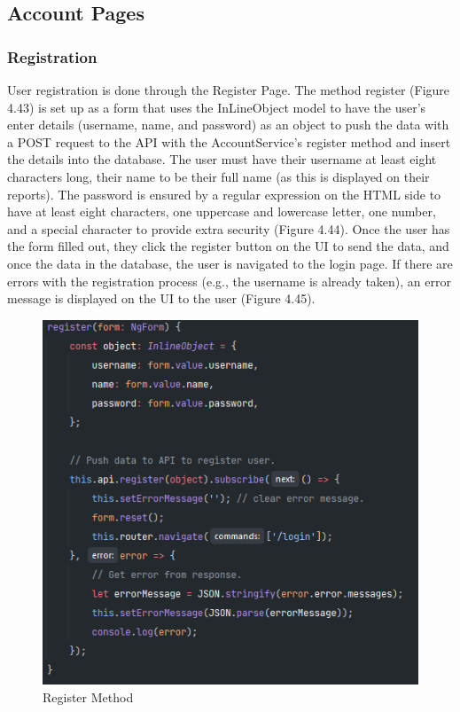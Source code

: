 \subsection{Account Pages}

\subsubsection{Registration}
User registration is done through the Register Page. The method register (Figure 4.43) is set up as a form that uses the InLineObject model to have the user's enter details (username, name, and password) as an object to push the data with a POST request to the API with the AccountService's register method and insert the details into the database. The user must have their username at least eight characters long, their name to be their full name (as this is displayed on their reports). The password is ensured by a regular expression on the HTML side to have at least eight characters, one uppercase and lowercase letter, one number, and a special character to provide extra security (Figure 4.44). Once the user has the form filled out, they click the register button on the UI to send the data, and once the data in the database, the user is navigated to the login page. If there are errors with the registration process (e.g., the username is already taken), an error message is displayed on the UI to the user (Figure 4.45).

\begin{figure}[H]
    \caption{Register Method}
    \label{image:registerMethod}
    \centering
    \includegraphics[width=1.0\textwidth]{images/repota/account_pages/register.png}
\end{figure}

